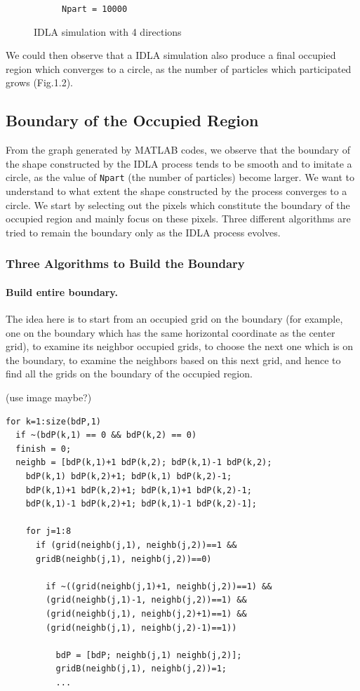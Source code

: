 \documentclass[letterpaper]{article}
\numberwithin{equation}{section} %
\numberwithin{figure}{section} %
\numberwithin{table}{section} %
\begin{document}
\begin{figure}[htbp]
\begin{subfigure}[b]{0.3\textwidth}
		\caption{\texttt{Npart = 10000}}
		\label{4direct_Npart10000_3suW11T}
	\end{subfigure}
	\caption{IDLA simulation with 4 directions}
	\label{IDLA simulation with 4 directions}
\end{figure}

\noindent
We could then observe that a IDLA simulation also produce a final occupied region which converges to a circle, as the number of particles which participated grows (Fig.1.2).

\subsection{Boundary of the Occupied Region}
From the graph generated by MATLAB codes, we observe that the boundary of the shape constructed by the IDLA process tends to be smooth and to imitate a circle, as the value of \texttt{Npart} (the number of particles) become larger. We want to understand to what extent the shape constructed by the process converges to a circle. We start by selecting out the pixels which constitute the boundary of the occupied region and mainly focus on these pixels. Three different algorithms are tried to remain the boundary only as the IDLA process evolves.

\subsubsection{Three Algorithms to Build the Boundary}

\paragraph{Build entire boundary.}
The idea here is to start from an occupied grid on the boundary (for example, one on the boundary which has the same horizontal coordinate as the center grid), to examine its neighbor occupied grids, to choose the next one which is on the boundary, to examine the neighbors based on this next grid, and hence to find all the grids on the boundary of the occupied region.

(use image maybe?)

\begin{lstlisting}
for k=1:size(bdP,1)  
  if ~(bdP(k,1) == 0 && bdP(k,2) == 0)  
  finish = 0;
  neighb = [bdP(k,1)+1 bdP(k,2); bdP(k,1)-1 bdP(k,2); 
    bdP(k,1) bdP(k,2)+1; bdP(k,1) bdP(k,2)-1; 
    bdP(k,1)+1 bdP(k,2)+1; bdP(k,1)+1 bdP(k,2)-1; 
    bdP(k,1)-1 bdP(k,2)+1; bdP(k,1)-1 bdP(k,2)-1];

    for j=1:8
      if (grid(neighb(j,1), neighb(j,2))==1 && 
      gridB(neighb(j,1), neighb(j,2))==0)  

        if ~((grid(neighb(j,1)+1, neighb(j,2))==1) && 
        (grid(neighb(j,1)-1, neighb(j,2))==1) && 
        (grid(neighb(j,1), neighb(j,2)+1)==1) && 
        (grid(neighb(j,1), neighb(j,2)-1)==1)) 

          bdP = [bdP; neighb(j,1) neighb(j,2)];    
          gridB(neighb(j,1), neighb(j,2))=1;  
          ...
\end{lstlisting}
\end{document}
